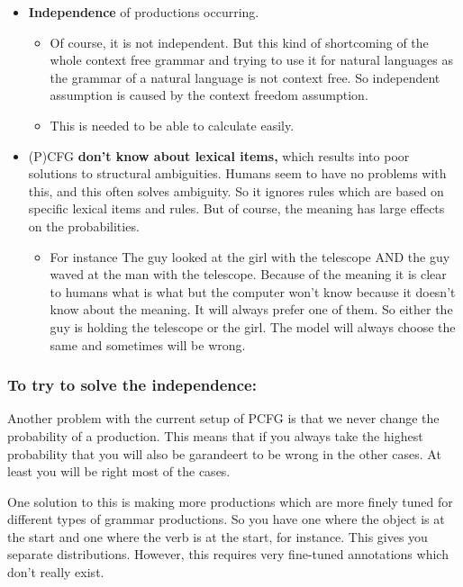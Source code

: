 \documentclass[
  11pt,
  british,
]{article}
\providecommand{\tightlist}{%
  \setlength{\itemsep}{0pt}\setlength{\parskip}{0pt}}
\begin{document}
\begin{itemize}
\tightlist
\item
  \textbf{Independence} of productions occurring.

  \begin{itemize}
  \tightlist
  \item
    Of course, it is not independent. But this kind of shortcoming of
    the whole context free grammar and trying to use it for natural
    languages as the grammar of a natural language is not context free.
    So independent assumption is caused by the context freedom
    assumption.\\
  \item
    This is needed to be able to calculate easily.
  \end{itemize}
\item
  (P)CFG \textbf{don't know about lexical items,} which results into
  poor solutions to structural ambiguities. Humans seem to have no
  problems with this, and this often solves ambiguity. So it ignores
  rules which are based on specific lexical items and rules. But of
  course, the meaning has large effects on the probabilities.

  \begin{itemize}
  \tightlist
  \item
    For instance The guy looked at the girl with the telescope AND the
    guy waved at the man with the telescope. Because of the meaning it
    is clear to humans what is what but the computer won't know because
    it doesn't know about the meaning. It will always prefer one of
    them. So either the guy is holding the telescope or the girl. The
    model will always choose the same and sometimes will be wrong.
  \end{itemize}
\end{itemize}

\hypertarget{to-try-to-solve-the-independence}{%
\subsubsection{To try to solve the
independence:}\label{to-try-to-solve-the-independence}}

Another problem with the current setup of PCFG is that we never change
the probability of a production. This means that if you always take the
highest probability that you will also be garandeert to be wrong in the
other cases. At least you will be right most of the cases.

One solution to this is making more productions which are more finely
tuned for different types of grammar productions. So you have one where
the object is at the start and one where the verb is at the start, for
instance. This gives you separate distributions. However, this requires
very fine-tuned annotations which don't really exist.
\end{document}
